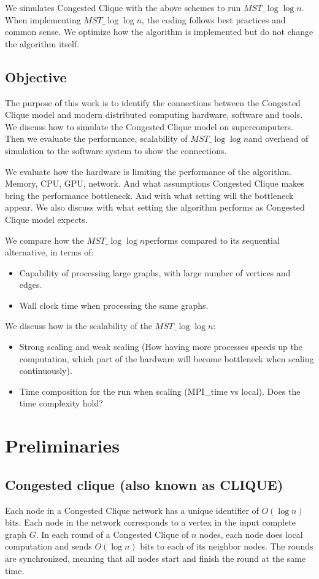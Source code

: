 \documentclass[english, 12pt, a4paper, elec, utf8, a-2b, online]{aaltothesis}
\newcommand{\mstalgo}{$MST\_\log\log{n}$}
\begin{document}
We simulates Congested Clique with the above schemes to run \mstalgo. When implementing \mstalgo, the coding follows best practices and common sense. We optimize how the algorithm is implemented but do not change the algorithm itself.
\subsection{Objective}
The purpose of this work is to identify the connections between the Congested Clique model and modern distributed computing hardware, software and tools. We discuss how to simulate the Congested Clique model on supercomputers. Then we evaluate the performance, scalability of \mstalgo and overhead of simulation to the software system to show the connections.

We evaluate how the hardware is limiting the performance of the algorithm. Memory, CPU, GPU, network. And what assumptions Congested Clique makes bring the performance bottleneck. And with what setting will the bottleneck appear. We also discuss with what setting the algorithm performs as Congested Clique model expects.

We compare how the \mstalgo performs compared to its sequential alternative, in terms of:
\begin{itemize}
	\item[--] Capability of processing large graphs, with large number of vertices and edges.
	\item[--] Wall clock time when processing the same graphs.
\end{itemize}
We discuss how is the scalability of the \mstalgo:
\begin{itemize}
	\item[--] Strong scaling and weak scaling (How having more processes speeds up the computation, which part of the hardware will become bottleneck when scaling continuously).
	\item[--] Time composition for the run when scaling (MPI\_time vs local). Does the time complexity hold?
\end{itemize}
\clearpage

\section{Preliminaries}

\subsection{Congested clique (also known as CLIQUE)}
Each node in a Congested Clique network has a unique identifier of $O(\log{n})$ bits. Each node in the network corresponds to a vertex in the input complete graph $G$. In each round of a Congested Clique of $n$ nodes, each node does local computation and sends $O(\log{n})$ bits to each of its neighbor nodes. The rounds are synchronized, meaning that all nodes start and finish the round at the same time. \cite{powerCongestClique}
\end{document}

